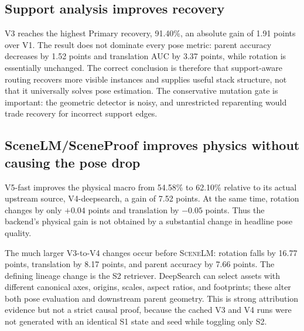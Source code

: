 \documentclass[10pt,twocolumn]{article}
\newcommand{\method}{\textsc{SceneLM}}
\begin{document}
\subsection{Support analysis improves recovery}

V3 reaches the highest Primary recovery, 91.40\%, an absolute gain of
1.91 points over V1.  The result does not dominate every pose metric: parent
accuracy decreases by 1.52 points and translation AUC by 3.37 points, while
rotation is essentially unchanged.  The correct conclusion is therefore that
support-aware routing recovers more visible instances and supplies useful
stack structure, not that it universally solves pose estimation.  The
conservative mutation gate is important: the geometric detector is noisy, and
unrestricted reparenting would trade recovery for incorrect support edges.

\subsection{SceneLM/SceneProof improves physics without causing the pose drop}

V5-fast improves the physical macro from 54.58\% to 62.10\% relative to its
actual upstream source, V4-deepsearch, a gain of 7.52 points.  At the same time,
rotation changes by only $+0.04$ points and translation by $-0.05$ points.
Thus the backend's physical gain is not obtained by a substantial change in
headline pose quality.

The much larger V3-to-V4 changes occur before \method{}: rotation falls by
16.77 points, translation by 8.17 points, and parent accuracy by 7.66 points.
The defining lineage change is the S2 retriever.  DeepSearch can select assets
with different canonical axes, origins, scales, aspect ratios, and footprints;
these alter both pose evaluation and downstream parent geometry.  This is
strong attribution evidence but not a strict causal proof, because the cached
V3 and V4 runs were not generated with an identical S1 state and seed while
toggling only S2.
\end{document}
